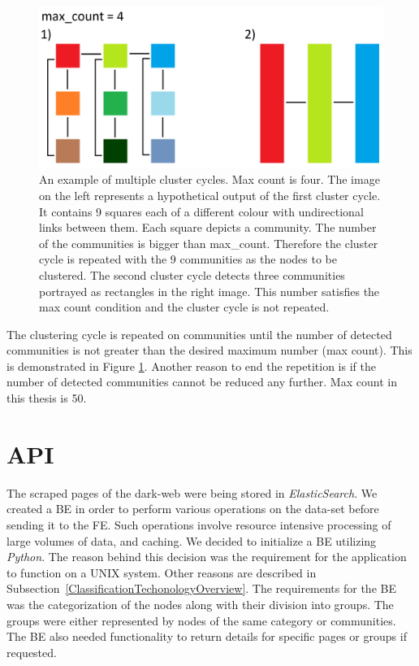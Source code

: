 \begin{figure}[ht!]
  \centering
  \includegraphics[width=\textwidth]{Images/clusteringCyclesExample.png}
  \caption{An example of multiple cluster cycles. Max count is four. The image on the left represents a hypothetical output of the first cluster cycle. It contains 9 squares each of a different colour with undirectional links between them. Each square depicts a community. The number of the communities is bigger than max\_count. Therefore the cluster cycle is repeated with the 9 communities as the nodes to be clustered. The second cluster cycle detects three communities portrayed as rectangles in the right image. This number satisfies the max count condition and the cluster cycle is not repeated.}
  \label{clusteringCyclesExample}
\end{figure} 

The clustering cycle is repeated on communities until the number of detected communities is not greater than the desired maximum number (max count). This is demonstrated in Figure \ref{clusteringCyclesExample}. Another reason to end the repetition is if the number of detected communities cannot be reduced any further. Max count in this thesis is 50.




\section{API}\label{APIDevelopment}
The scraped pages of the dark-web were being stored in \textit{ElasticSearch}. We created a BE in order to perform various operations on the data-set before sending it to the FE. Such operations involve resource intensive processing of large volumes of data, and caching. We decided to initialize a BE utilizing \textit{Python}. The reason behind this decision was the requirement for the application to function on a UNIX system. Other reasons are described in Subsection~\ref{ClassificationTechonologyOverview}. The requirements for the BE was the categorization of the nodes along with their division into groups. The groups were either represented by nodes of the same category or communities. The BE also needed functionality to return details for specific pages or groups if requested.


